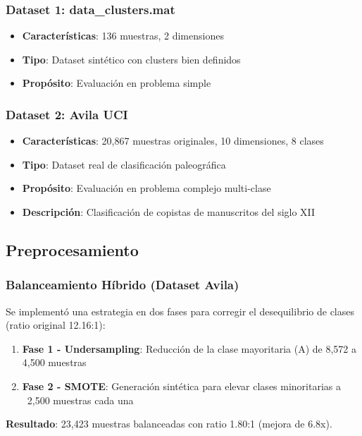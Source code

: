 \documentclass[12pt,a4paper]{article}
\begin{document}
\subsubsection{Dataset 1: data\_clusters.mat}
\begin{itemize}
    \item \textbf{Características}: 136 muestras, 2 dimensiones
    \item \textbf{Tipo}: Dataset sintético con clusters bien definidos
    \item \textbf{Propósito}: Evaluación en problema simple
\end{itemize}

\subsubsection{Dataset 2: Avila UCI}
\begin{itemize}
    \item \textbf{Características}: 20,867 muestras originales, 10 dimensiones, 8 clases
    \item \textbf{Tipo}: Dataset real de clasificación paleográfica
    \item \textbf{Propósito}: Evaluación en problema complejo multi-clase
    \item \textbf{Descripción}: Clasificación de copistas de manuscritos del siglo XII
\end{itemize}

\subsection{Preprocesamiento}

\subsubsection{Balanceamiento Híbrido (Dataset Avila)}
Se implementó una estrategia en dos fases para corregir el desequilibrio de clases (ratio original 12.16:1):

\begin{enumerate}
    \item \textbf{Fase 1 - Undersampling}: Reducción de la clase mayoritaria (A) de 8,572 a 4,500 muestras
    \item \textbf{Fase 2 - SMOTE}: Generación sintética para elevar clases minoritarias a ~2,500 muestras cada una
\end{enumerate}

\textbf{Resultado}: 23,423 muestras balanceadas con ratio 1.80:1 (mejora de 6.8x).
\end{document}
